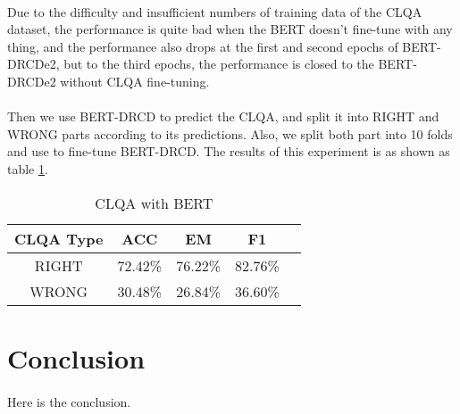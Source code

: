 \documentclass{article}
\begin{document}
\paragraph{}
Due to the difficulty and insufficient numbers of training data of the CLQA dataset, the performance is quite bad when the BERT doesn't fine-tune with any thing, and the performance also drops at the first and second epochs of BERT-DRCDe2, but to the third epochs, the performance is closed to the BERT-DRCDe2 without CLQA fine-tuning.

\paragraph{}
Then we use BERT-DRCD to predict the CLQA, and split it into RIGHT and WRONG parts according to its predictions. Also, we split both part into 10 folds and use to fine-tune BERT-DRCD. The results of this experiment is as shown as table \ref{tab:bert-clqa-right-wrong}.

\begin{table}[ht!]
  \centering
  \caption{CLQA with BERT}
  \begin{tabular}{ccccc}
    CLQA Type & ACC & EM & F1\\
    \toprule
    RIGHT & 72.42\% & 76.22\% & 82.76\% \\
    WRONG & 30.48\% & 26.84\% & 36.60\% \\
  \end{tabular}
  \label{tab:bert-clqa-right-wrong}
\end{table}

\section{Conclusion}
\paragraph{}
Here is the conclusion.



\end{document}
